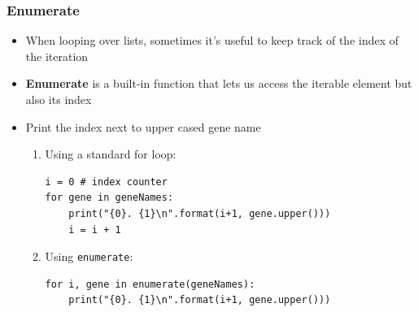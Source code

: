 \documentclass[xcolor=table]{beamer}
\begin{document}
\begin{frame}[fragile]
\frametitle{Enumerate}

\begin{itemize}\addtolength{\itemsep}{0.5\baselineskip}
\item<1-> When looping over lists, sometimes it's useful to keep track of the
index of the iteration

\item<2-> \textbf{Enumerate} is a built-in function that lets us access the
iterable element but also its index

\item<3-> Print the index next to upper cased gene name

\begin{enumerate}\addtolength{\itemsep}{-1\baselineskip}

\item<3-> Using a standard for loop:
\begin{lstlisting}[style=python]
i = 0 # index counter
for gene in geneNames:
    print("{0}. {1}\n".format(i+1, gene.upper()))
    i = i + 1
\end{lstlisting}

\item<4-> Using \texttt{enumerate}:
\begin{lstlisting}[style=python]
for i, gene in enumerate(geneNames):
    print("{0}. {1}\n".format(i+1, gene.upper()))
\end{lstlisting}

\end{enumerate}
\end{itemize}

\end{frame}

\end{document}

